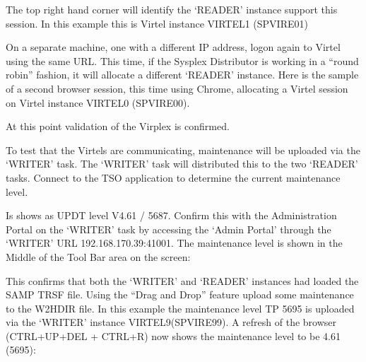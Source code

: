 \documentclass[letterpaper,10pt,english]{sphinxmanual}
\begin{document}
\sphinxAtStartPar
{}

\sphinxAtStartPar
The top right hand corner will identify the ‘READER’ instance support this session. In this example this is Virtel instance VIRTEL1 (SPVIRE01)

\sphinxAtStartPar
{}

\sphinxAtStartPar
On a separate machine, one with a different IP address, logon again to Virtel using the same URL. This time, if the Sysplex Distributor is working in a “round robin” fashion, it will allocate a different ‘READER’ instance. Here is the sample of a second browser session, this time using Chrome, allocating a Virtel session on Virtel instance VIRTEL0 (SPVIRE00).

\sphinxAtStartPar
{}

\sphinxAtStartPar
At this point validation of the Virplex is confirmed.

\ignorespaces 
\sphinxAtStartPar
{}

\sphinxAtStartPar
To test that the Virtels are communicating, maintenance will be uploaded via the ‘WRITER’ task. The ‘WRITER’ task will distributed this to the two ‘READER’ tasks. Connect to the TSO application to determine the current maintenance level.

\sphinxAtStartPar
{}

\sphinxAtStartPar
Is shows as UPDT level V4.61 / 5687. Confirm this with the Administration Portal on the ‘WRITER’ task by accessing the ‘Admin Portal’ through the ‘WRITER’ URL 192.168.170.39:41001. The maintenance level is shown in the Middle of the Tool Bar area on the screen:\sphinxhyphen{}

\sphinxAtStartPar
{}

\sphinxAtStartPar
This confirms that both the ‘WRITER’ and ‘READER’ instances had loaded the SAMP TRSF file. Using the “Drag and Drop” feature upload some maintenance to the W2H\sphinxhyphen{}DIR file. In this example the maintenance level TP 5695 is uploaded via the ‘WRITER’ instance VIRTEL9(SPVIRE99). A refresh of the browser (CTRL+UP+DEL + CTRL+R) now shows the maintenance level to be 4.61 (5695):\sphinxhyphen{}
\end{document}
